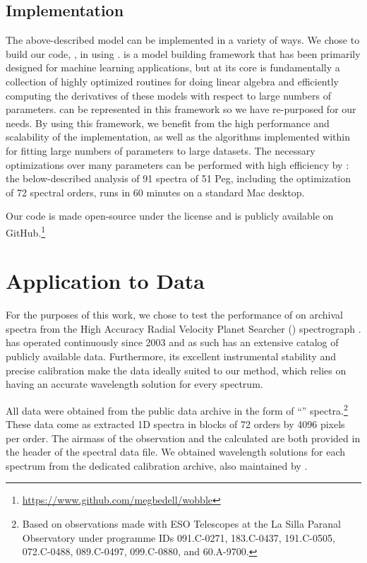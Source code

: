 \documentclass[twocolumn]{aastex62}
\begin{document}
\subsection{Implementation}
\label{s:implementation}

The above-described model can be implemented in a variety of ways. We chose to build our code, \wobble, in  using \TF \citep{Abadi15}. 
\TF is a model building framework that has been primarily designed for machine
learning applications, but at its core \TF is fundamentally a collection of
highly optimized routines for doing linear algebra and efficiently computing the
derivatives of these models with respect to large numbers of parameters.
\wobble can be represented in this framework so we have re-purposed \TF for our
needs.
By using this framework, we benefit from the high performance and scalability
of the implementation, as well as the algorithms implemented within \TF for
fitting large numbers of parameters to large datasets.
The necessary optimizations over many parameters can be performed with high efficiency by \TF: the below-described analysis of 91 \HARPS spectra of 51 Peg, including the optimization of 72 spectral orders, runs in 60 minutes on a standard Mac desktop.

Our code is made open-source under the  license and is publicly available on GitHub.\footnote{\url{https://www.github.com/megbedell/wobble}}



\section{Application to \HARPS Data}
\label{s:results}

For the purposes of this work, we chose to test the performance of  on archival spectra from the High Accuracy Radial Velocity Planet Searcher (\HARPS) spectrograph \citep{Mayor2003}. 
\HARPS has operated continuously since 2003 and as such has an extensive catalog of publicly available data. 
Furthermore, its excellent instrumental stability and precise calibration make the data ideally suited to our method, which relies on having an accurate wavelength solution for every spectrum. 

All data were obtained from the  public data archive in the form of ``'' spectra.\footnote{Based on observations made with ESO Telescopes at the La Silla Paranal Observatory under programme IDs 091.C-0271, 183.C-0437, 191.C-0505, 072.C-0488, 089.C-0497, 099.C-0880, and 60.A-9700.} 
These data come as extracted  1D spectra in blocks of 72 orders by 4096 pixels per order.
The airmass of the observation and the calculated \BERV are both provided in the  header of the spectral data file. 
We obtained wavelength solutions for each spectrum from the dedicated \HARPS calibration archive, also maintained by .
\end{document}
